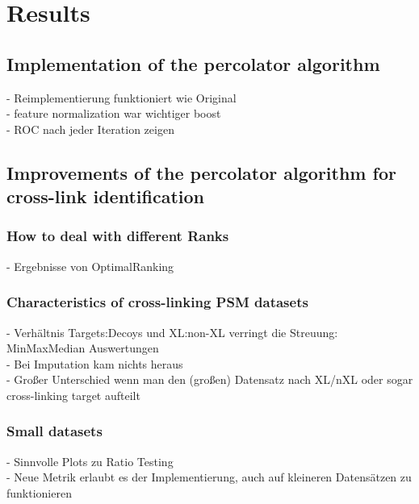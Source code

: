 \chapter{Results}
\label{results}


\section{Implementation of the percolator algorithm}
- Reimplementierung funktioniert wie Original\\
- feature normalization war wichtiger boost\\
- ROC nach jeder Iteration zeigen

\section{Improvements of the percolator algorithm for cross-link identification}
\subsection{How to deal with different Ranks}
- Ergebnisse von OptimalRanking

\subsection{Characteristics of cross-linking PSM datasets}
- Verhältnis Targets:Decoys und XL:non-XL verringt die Streuung: MinMaxMedian Auswertungen\\
- Bei Imputation kam nichts heraus\\
- Großer Unterschied wenn man den (großen) Datensatz nach XL/nXL oder sogar cross-linking target aufteilt\\

\subsection{Small datasets}
- Sinnvolle Plots zu Ratio Testing\\
- Neue Metrik erlaubt es der Implementierung, auch auf kleineren Datensätzen zu funktionieren